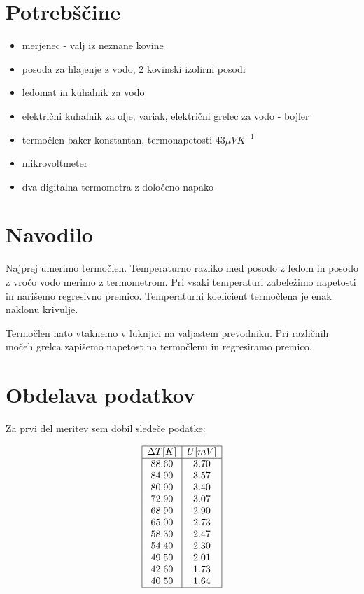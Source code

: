 \documentclass[12pt]{report}
\begin{document}
\begingroup
\let\clearpage\relax

\chapter*{Potrebščine}
\begin{itemize}
  \item merjenec - valj iz neznane kovine 
  \item posoda za hlajenje z vodo, 2 kovinski izolirni posodi 
  \item ledomat in kuhalnik za vodo
  \item električni kuhalnik za olje, variak, električni grelec za vodo - bojler 
  \item termočlen baker-konstantan, termonapetosti $43\mu VK^{-1}$
  \item mikrovoltmeter 
  \item dva digitalna termometra z določeno napako
\end{itemize}

\chapter*{Navodilo}
Najprej umerimo termočlen. Temperaturno razliko med posodo z ledom in posodo z vročo vodo merimo z termometrom. Pri vsaki temperaturi zabeležimo napetosti in narišemo regresivno premico. Temperaturni koeficient termočlena je enak naklonu krivulje. 

Termočlen nato vtaknemo v luknjici na valjastem prevodniku. Pri različnih močeh grelca zapišemo napetost na termočlenu in regresiramo premico. 
\endgroup


\chapter*{Obdelava podatkov}

Za prvi del meritev sem dobil sledeče podatke: 


\begin{tabela}[H]
  \centering
  \[
  \begin{array}{|c|c|} \hline
    \Delta T [K] & U[mV] \\ \hline
    88.60 &    3.70\\
    84.90 &    3.57\\
    80.90 &    3.40\\
    72.90 &    3.07\\
    68.90 &    2.90\\
    65.00 &    2.73\\
    58.30 &    2.47\\
    54.40 &    2.30\\
    49.50 &    2.01\\
    42.60 &    1.73\\
    40.50 &    1.64 \\ \hline
 \end{array}
 \]
\end{tabela}
\end{document}
